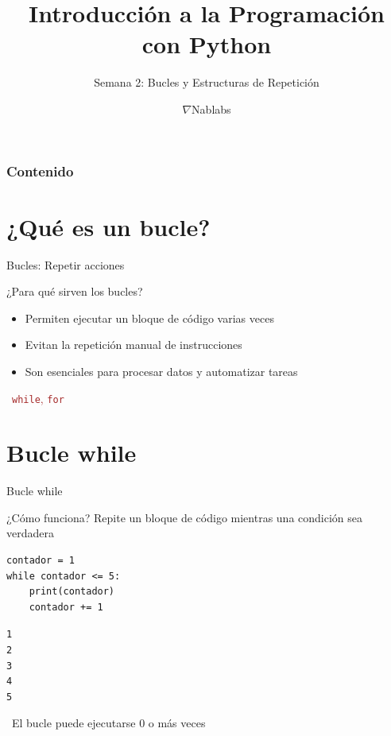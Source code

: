 \documentclass{beamer}
\title{\textbf{Introducción a la Programación con Python}}
\subtitle{Semana 2: Bucles y Estructuras de Repetición}
\author{$\nabla$Nablabs}
\date{}
\begin{document}
\begin{frame}
\titlepage
\end{frame}

\begin{frame}
\frametitle{Contenido}
\tableofcontents
\end{frame}

\section{¿Qué es un bucle?}

\begin{frame}{Bucles: Repetir acciones \faRedo}
\begin{conceptbox}{¿Para qué sirven los bucles?}
\small
\begin{itemize}
    \item[\faSync] Permiten ejecutar un bloque de código varias veces
    \item[\faSync] Evitan la repetición manual de instrucciones
    \item[\faSync] Son esenciales para procesar datos y automatizar tareas
\end{itemize}
\end{conceptbox}

\vspace{0.2cm}
\begin{center}
\large\textcolor{brown}{\faCogs\ \texttt{while}, \texttt{for}}
\end{center}
\end{frame}

\section{Bucle while}

\begin{frame}[fragile]{Bucle while \faSync}
\begin{conceptbox}{¿Cómo funciona?}
Repite un bloque de código mientras una condición sea verdadera
\end{conceptbox}

\begin{lstlisting}
contador = 1
while contador <= 5:
    print(contador)
    contador += 1
\end{lstlisting}

\vspace{-0.2cm}
\begin{tcolorbox}[colback=green!10,colframe=green,title={\small\faArrowCircleRight \ Salida},coltitle=fg0,left=3pt,right=3pt,top=2pt,bottom=2pt,boxsep=1pt]
\small\texttt{1\\
2\\
3\\
4\\
5}
\end{tcolorbox}

\vspace{-0.1cm}
\begin{notebox}
\small\faInfoCircle\ El bucle puede ejecutarse 0 o más veces
\end{notebox}
\end{frame}
\end{document}

